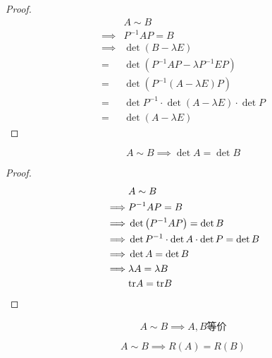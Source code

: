 \documentclass{article}
\begin{document}
\begin{proof}
    \[\begin{aligned}
                     & A\sim B                                                 \\
            \implies & P^{-1}AP=B                                              \\
            \implies & \det\left(B-\lambda E\right)                            \\
            =        & \det\left(P^{-1}AP-\lambda P^{-1}EP\right)              \\
            =        & \det\left(P^{-1}\left(A-\lambda E\right)P\right)        \\
            =        & \det P^{-1}\cdot\det\left(A-\lambda E\right)\cdot\det P \\
            =        & \det\left(A-\lambda E\right)
        \end{aligned}\]
\end{proof}

\begin{theorem}[相似方阵行列式相同]
    \[A\sim B\implies\det A=\det B\]
\end{theorem}

\begin{proof}
    \[\begin{aligned}
                     & A\sim B                                   \\
            \implies & P^{-1}AP=B                                \\
            \implies & \det\left(P^{-1}AP\right)=\det B          \\
            \implies & \det P^{-1}\cdot\det A\cdot\det P =\det B \\
            \implies & \det A=\det B                             \\
            \implies & \lambda A=\lambda B                       \\
                     & {\rm tr}A={\rm tr}B
        \end{aligned}\]
\end{proof}

\begin{theorem}[相似方阵等价]
    \[A\sim B\implies A,B\text{等价}\]
\end{theorem}

\begin{corollary}[相似方阵秩相同]
    \[A\sim B\implies R\left(A\right)=R\left(B\right)\]
\end{corollary}
\end{document}
